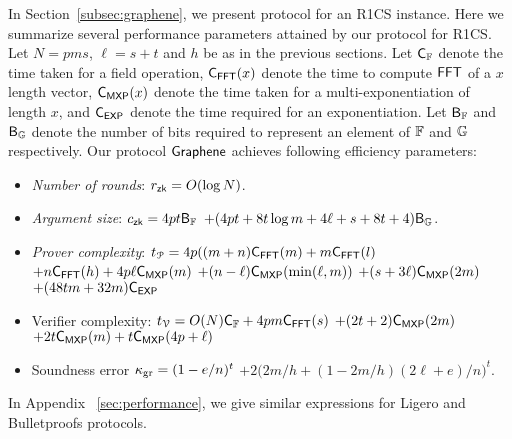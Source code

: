 In Section~\ref{subsec:graphene}, we present protocol for an R1CS instance. Here we summarize several performance parameters attained by our protocol for R1CS. Let $N= pms$, $\ell = s+t$ and $h$ be as in the previous sections. Let $\mathsf{C}_\mathbb{F}$ denote the time taken for a field operation, $\mathsf{C}_\mathsf{FFT}(x)$ denote the time to compute $\mathsf{FFT}$ of a $x$ length vector, $\mathsf{C}_\mathsf{MXP}(x)$ denote the time taken for a multi-exponentiation of length $x$, and $\mathsf{C}_\mathsf{EXP}$ denote the time required for an exponentiation. Let $\mathsf{B}_\mathbb{F}$ and $\mathsf{B}_\mathbb{G}$ denote the number of bits required to represent an element of $\mathbb{F}$ and $\mathbb{G}$ respectively. Our protocol $\textsf{Graphene}$ achieves following efficiency parameters: 



\begin{itemize}
\item {\em Number of rounds}: $r_\mathsf{zk}=O(\log{N})$.
\item {\em Argument size}: $c_\mathsf{zk}= 4pt\mathsf{B}_\mathbb{F}$
$+(4pt+8t\log{m}+4\ell+s+8t+4)\mathsf{B}_\mathbb{G}$.
\item {\em Prover complexity}: $t_{\mathcal{P}}=4p((m+n)\mathsf{C}_\mathsf{FFT}(m)+m\mathsf{C}_\mathsf{FFT}(l)$
$+n\mathsf{C}_\mathsf{FFT}(h) + 4p\ell\mathsf{C}_\mathsf{MXP}(m)$
 $+(n-\ell)\mathsf{C}_\mathsf{MXP}(\min(\ell,m))$
 $+(s+3\ell)\mathsf{C}_\mathsf{MXP}(2m)$ $+ (48tm+32m)\mathsf{C}_\mathsf{EXP}$
\item {Verifier complexity}:  $t_{\mathcal{V}}=O(N)\mathsf{C}_\mathbb{F} + 4pm\mathsf{C}_\mathsf{FFT}(s)$
 $+(2t+2)\mathsf{C}_\mathsf{MXP}(2m)$
 $+2t\mathsf{C}_\mathsf{MXP}(m)+t\mathsf{C}_\mathsf{MXP}(4p+\ell)$
\item{Soundness error} $\kappa_{\rm gr} = (1-e/n)^t$
 $+2\big(2m/h+(1-2m/h)(2\ell+e)/n\big)^t$.
\end{itemize}

In Appendix ~\ref{sec:performance}, we give similar expressions for Ligero and
Bulletproofs protocols. 

